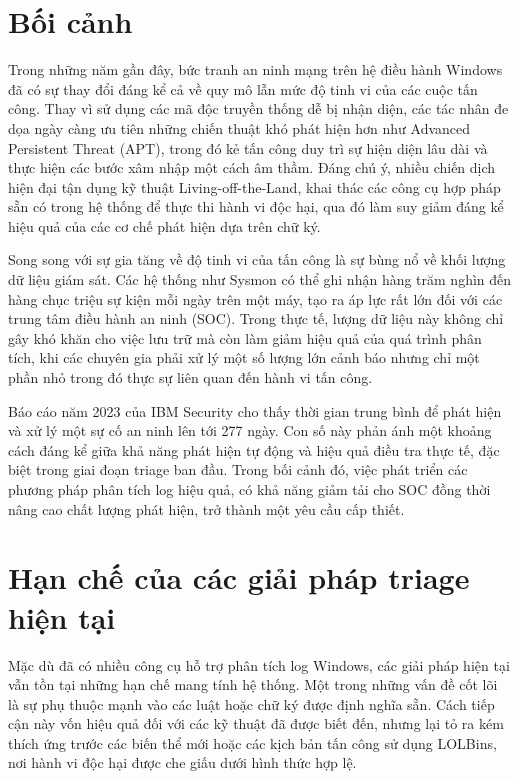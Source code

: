 \documentclass[../main.tex]{subfiles}
\begin{document}
\section*{Bối cảnh}

Trong những năm gần đây, bức tranh an ninh mạng trên hệ điều hành Windows đã có sự thay đổi đáng kể cả về quy mô lẫn mức độ tinh vi của các cuộc tấn công. Thay vì sử dụng các mã độc truyền thống dễ bị nhận diện, các tác nhân đe dọa ngày càng ưu tiên những chiến thuật khó phát hiện hơn như Advanced Persistent Threat (APT), trong đó kẻ tấn công duy trì sự hiện diện lâu dài và thực hiện các bước xâm nhập một cách âm thầm. Đáng chú ý, nhiều chiến dịch hiện đại tận dụng kỹ thuật Living-off-the-Land, khai thác các công cụ hợp pháp sẵn có trong hệ thống để thực thi hành vi độc hại, qua đó làm suy giảm đáng kể hiệu quả của các cơ chế phát hiện dựa trên chữ ký.

Song song với sự gia tăng về độ tinh vi của tấn công là sự bùng nổ về khối lượng dữ liệu giám sát. Các hệ thống như Sysmon có thể ghi nhận hàng trăm nghìn đến hàng chục triệu sự kiện mỗi ngày trên một máy, tạo ra áp lực rất lớn đối với các trung tâm điều hành an ninh (SOC). Trong thực tế, lượng dữ liệu này không chỉ gây khó khăn cho việc lưu trữ mà còn làm giảm hiệu quả của quá trình phân tích, khi các chuyên gia phải xử lý một số lượng lớn cảnh báo nhưng chỉ một phần nhỏ trong đó thực sự liên quan đến hành vi tấn công.

Báo cáo năm 2023 của IBM Security cho thấy thời gian trung bình để phát hiện và xử lý một sự cố an ninh lên tới 277 ngày. Con số này phản ánh một khoảng cách đáng kể giữa khả năng phát hiện tự động và hiệu quả điều tra thực tế, đặc biệt trong giai đoạn triage ban đầu. Trong bối cảnh đó, việc phát triển các phương pháp phân tích log hiệu quả, có khả năng giảm tải cho SOC đồng thời nâng cao chất lượng phát hiện, trở thành một yêu cầu cấp thiết.

\section*{Hạn chế của các giải pháp triage hiện tại}

Mặc dù đã có nhiều công cụ hỗ trợ phân tích log Windows, các giải pháp hiện tại vẫn tồn tại những hạn chế mang tính hệ thống. Một trong những vấn đề cốt lõi là sự phụ thuộc mạnh vào các luật hoặc chữ ký được định nghĩa sẵn. Cách tiếp cận này vốn hiệu quả đối với các kỹ thuật đã được biết đến, nhưng lại tỏ ra kém thích ứng trước các biến thể mới hoặc các kịch bản tấn công sử dụng LOLBins, nơi hành vi độc hại được che giấu dưới hình thức hợp lệ.
\end{document}
